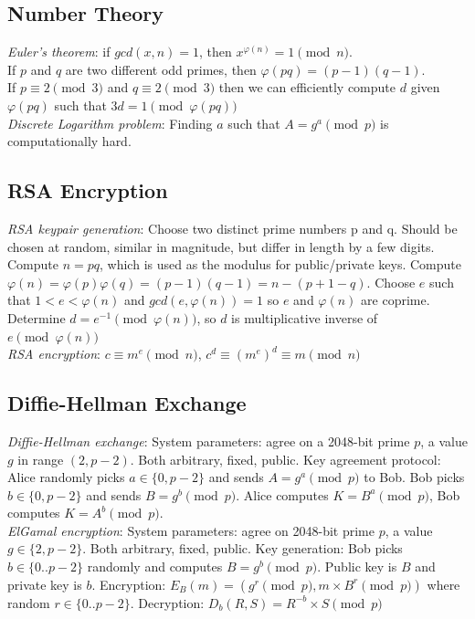 \documentclass[10pt,landscape]{article}
\newcommand{\totient}{\varphi}
\begin{document}
\begin{multicols}{3}
\subsection{Number Theory}

\textit{Euler's theorem}: if $gcd(x, n) = 1$, then $x^{\totient(n)} = 1 \pmod{n}$. \\
If $p$ and $q$ are two different odd primes, then $\totient(pq) = (p-1)(q-1)$. \\
If $p \equiv 2 \pmod{3}$ and $q \equiv 2 \pmod{3}$ then we can efficiently compute $d$ given $\totient(pq)$ such that $3d = 1 \pmod{\totient(pq)}$ \\
\textit{Discrete Logarithm problem}: Finding $a$ such that $A = g^a \pmod{p}$ is computationally hard.

\subsection{RSA Encryption}

\textit{RSA keypair generation}: Choose two distinct prime numbers p and q. Should be chosen at random, similar in magnitude, but differ in length by a few digits. Compute $n = pq$, which is used as the modulus for public/private keys. Compute $\totient(n) = \totient(p)\totient(q) = (p-1)(q-1) = n -(p+1-q)$. Choose $e$ such that $1 < e < \totient(n)$ and $gcd(e, \totient(n)) = 1$ so $e$ and $\totient(n)$ are coprime. Determine $d = e^{-1} \pmod{\totient(n)}$, so $d$ is multiplicative inverse of $e \pmod{\totient(n)}$ \\
\textit{RSA encryption}: $c \equiv m^e \pmod{n}$, $c^d \equiv (m^e)^d \equiv m \pmod{n}$

\subsection{Diffie-Hellman Exchange}

\textit{Diffie-Hellman exchange}: System parameters: agree on a 2048-bit prime $p$, a value $g$ in range $(2, p-2)$. Both arbitrary, fixed, public. Key agreement protocol: Alice randomly picks $a \in \{0, p-2\}$ and sends $A = g^a \pmod{p}$ to Bob. Bob picks $b \in \{0, p-2\}$ and sends $B = g^b \pmod{p}$. Alice computes $K = B^a \pmod{p}$, Bob computes $K = A^b \pmod{p}$. \\
\textit{ElGamal encryption}: System parameters: agree on 2048-bit prime $p$, a value $g \in \{2, p-2\}$. Both arbitrary, fixed, public. Key generation: Bob picks $b \in \{0..p-2\}$ randomly and computes $B = g^b \pmod{p}$. Public key is $B$ and private key is $b$. Encryption: $E_B(m) = (g^r \pmod{p}, m \times B^r \pmod{p})$ where random $r \in \{0..p-2\}$. Decryption: $D_b(R, S) = R^{-b} \times S \pmod{p}$



\end{multicols}
\end{document}
